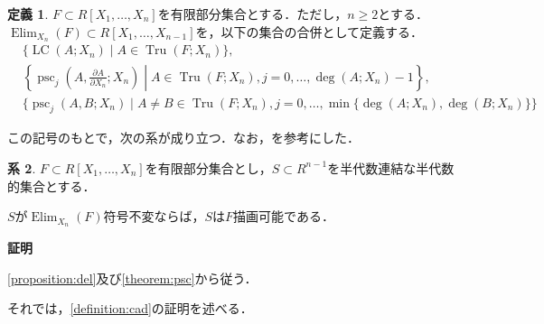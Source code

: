 \documentclass[uplatex, dvipdfmx]{jsarticle}
\makeatletter
\numberwithin{equation}{section}
\renewenvironment{proof}[1][\proofname]{\par
  \pushQED{\qed}%
  \normalfont \topsep6\p@\@plus6\p@\relax
  \trivlist
  \item\relax
  {\bfseries
  #1\@addpunct{.}}\hspace\labelsep\ignorespaces
}{
  \popQED\endtrivlist\@endpefalse
}
\DeclareMathOperator{\psc}{psc}
\DeclareMathOperator{\PSC}{PSC}
\DeclareMathOperator{\Elim}{Elim}
\DeclareMathOperator{\Tru}{Tru}
\DeclareMathOperator{\LC}{LC}
\theoremstyle{definition}
\newtheorem{definition}{定義}[section]
\newtheorem{corollary}[definition]{系}
\renewcommand{\proofname}{\textbf{証明}}
\makeatother
\begin{document}
\begin{definition}
$F \subset R[X_1, \dots, X_n]$を有限部分集合とする．ただし，$n \geq 2$とする．
$\Elim_{X_n}(F) \subset R[X_1, \dots, X_{n-1}]$を，以下の集合の合併として定義する．
\begin{align} 
     &\{\LC(A;X_n) \mid A \in \Tru(F;X_n) \},\\
     &\left\{ \psc_j\left(A,\frac{\partial A}{\partial X_n};X_n\right) \middle| A \in \Tru(F;X_n), j= 0, \dots, \deg(A;X_n)-1\right\},\\
     &\{\psc_j(A,B;X_n) \mid A \neq B \in \Tru(F; X_n), j = 0, \dots, \min\{\deg(A;X_n), \deg(B;X_n)\}\}
\end{align}
\end{definition}

この記号のもとで，次の系が成り立つ．なお，\cite[Theorem 5.16.]{MR2248869}を参考にした．

\begin{corollary}\label{corollary:inv-deline}
$F \subset R[X_1, \dots, X_n]$を有限部分集合とし，$S \subset R^{n-1}$を半代数連結な半代数的集合とする．

$S$が$\Elim_{X_n}(F)$符号不変ならば，$S$は$F$描画可能である．
\end{corollary}

\begin{proof}
\cref{proposition:del}及び\cref{theorem:psc}から従う．
\end{proof}

それでは，\cref{definition:cad}の証明を述べる．
\end{document}
